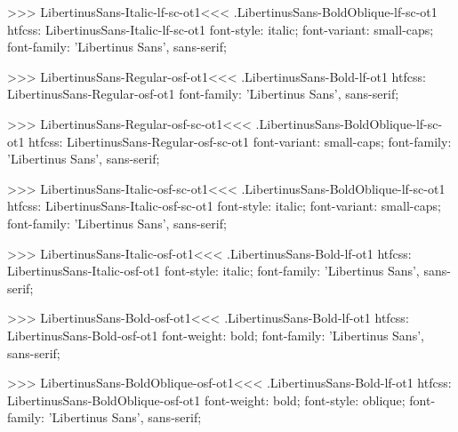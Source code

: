 >>>
\<LibertinusSans-Italic-lf-sc-ot1\><<<
.LibertinusSans-BoldOblique-lf-sc-ot1
htfcss:  LibertinusSans-Italic-lf-sc-ot1  font-style: italic; font-variant: small-caps; font-family: 'Libertinus Sans', sans-serif;

>>>
\<LibertinusSans-Regular-osf-ot1\><<<
.LibertinusSans-Bold-lf-ot1
htfcss:  LibertinusSans-Regular-osf-ot1  font-family: 'Libertinus Sans', sans-serif;

>>>
\<LibertinusSans-Regular-osf-sc-ot1\><<<
.LibertinusSans-BoldOblique-lf-sc-ot1
htfcss:  LibertinusSans-Regular-osf-sc-ot1  font-variant: small-caps; font-family: 'Libertinus Sans', sans-serif;

>>>
\<LibertinusSans-Italic-osf-sc-ot1\><<<
.LibertinusSans-BoldOblique-lf-sc-ot1
htfcss:  LibertinusSans-Italic-osf-sc-ot1  font-style: italic; font-variant: small-caps; font-family: 'Libertinus Sans', sans-serif;

>>>
\<LibertinusSans-Italic-osf-ot1\><<<
.LibertinusSans-Bold-lf-ot1
htfcss:  LibertinusSans-Italic-osf-ot1  font-style: italic; font-family: 'Libertinus Sans', sans-serif;

>>>
\<LibertinusSans-Bold-osf-ot1\><<<
.LibertinusSans-Bold-lf-ot1
htfcss:  LibertinusSans-Bold-osf-ot1  font-weight: bold; font-family: 'Libertinus Sans', sans-serif;

>>>
\<LibertinusSans-BoldOblique-osf-ot1\><<<
.LibertinusSans-Bold-lf-ot1
htfcss:  LibertinusSans-BoldOblique-osf-ot1  font-weight: bold; font-style: oblique; font-family: 'Libertinus Sans', sans-serif;

